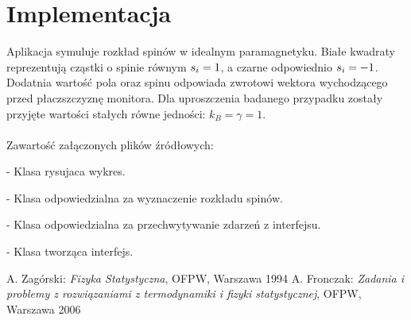 \documentclass[a4paper,10pt]{article}
\begin{document}
	\section{Implementacja}
	Aplikacja symuluje rozkład spinów w idealnym paramagnetyku. Białe kwadraty reprezentują cząstki o spinie równym  $s_{i}\nolinebreak=\nolinebreak1$, a czarne odpowiednio $s_{i}\nolinebreak=\nolinebreak-1$. Dodatnia wartość pola oraz spinu odpowiada zwrotowi wektora wychodzącego przed płaczszczyznę monitora. Dla uproszczenia badanego przypadku zostały przyjęte wartości stałych równe jedności: $k_{B}=\gamma=1$. \\ \\
	Zawartość załączonych plików źródłowych:\\
		\begin{description}
		\setlength{\itemindent}{0cm}
		\item[Graph.java] - Klasa rysujaca wykres.
		\item[GraphUpdater.java] - Klasa odpowiedzialna za wyznaczenie rozkładu spinów.
		\item[ModificationListener.java] - Klasa odpowiedzialna za przechwytywanie zdarzeń z interfejsu.
		\item[Window.java] - Klasa tworząca interfejs.
		\end{description}
		
	\begin{thebibliography}{99}
		 A. Zagórski:
			\emph{Fizyka Statystyczna},
			 OFPW, Warszawa 1994
		 A. Fronczak:
			\emph{Zadania i problemy z rozwiązaniami z termodynamiki i fizyki statystycznej},
			 OFPW, Warszawa 2006
		\end{thebibliography}
	
\end{document}
